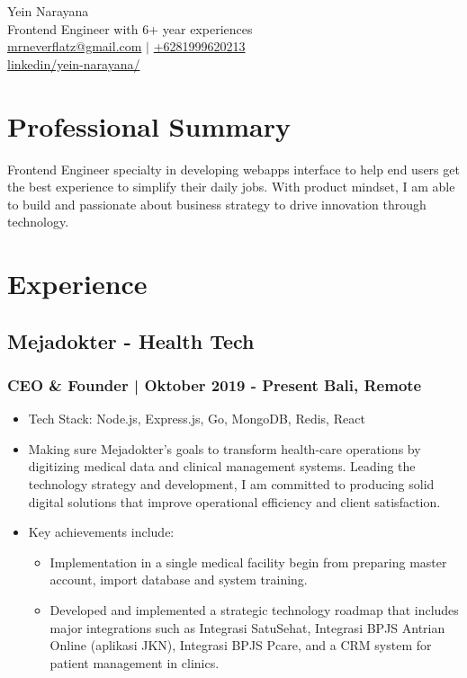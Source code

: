 \documentclass[11pt]{article}
\begin{document}
\begin{center}
    {\fontsize{36}{36}\selectfont \interheavy Yein Narayana} \\ \bigskip
    {\color{gray}\fontsize{13}{13}\selectfont Frontend Engineer with 6+ year experiences} \\ \bigskip
    {\color{icnclr}\faEnvelope[regular]} \href{mailto:mrneverflatz@gmail.com}{mrneverflatz@gmail.com} $|$
    {\color{icnclr}} \href{tel:+6281999620213}{+6281999620213}
    \\ {\color{icnclr}\faLinkedinIn} \href{https://www.linkedin.com/in/yein-narayana/}{linkedin/yein-narayana/}
\end{center}

\section{Professional Summary}
 {Frontend Engineer specialty in developing webapps interface to help end users get the best experience to simplify their daily jobs. With product mindset, I am able to build and passionate about business strategy to drive innovation through technology.}


\section{Experience}
\subsection{Mejadokter - Health Tech}
\subsubsection{CEO \& Founder | Oktober 2019 - Present \hfill Bali, Remote}
\begin{itemize}
    \item Tech Stack: Node.js, Express.js, Go, MongoDB, Redis, React
    \item Making sure Mejadokter's goals to transform health-care operations by digitizing medical data and clinical management systems. Leading the technology strategy and development, I am committed to producing solid digital solutions that improve operational efficiency and client satisfaction.
    \item Key achievements include:
          \begin{itemize}
              \item Implementation in a single medical facility begin from preparing master account, import database and system training.
              \item  Developed and implemented a strategic technology roadmap that includes major integrations such as Integrasi SatuSehat, Integrasi BPJS Antrian Online (aplikasi JKN), Integrasi BPJS Pcare, and a CRM system for patient management in clinics.
          \end{itemize}
\end{itemize}
\end{document}
